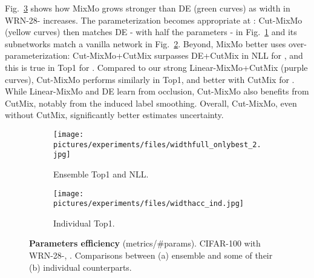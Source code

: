 \documentclass[10pt,twocolumn,letterpaper]{article}
\begin{document}
Fig.~\ref{fig:paramefficient} shows how MixMo grows stronger than DE (green curves) as width  in WRN-28- increases. The parameterization becomes
appropriate at :
Cut-MixMo (yellow curves) then matches DE - with half the parameters - in
Fig.~\ref{fig:widthcx} and its subnetworks match a vanilla
network in Fig.~\ref{fig:indacc}. Beyond, MixMo better uses over-parameterization:
Cut-MixMo+CutMix surpasses DE+CutMix in NLL for , and this is true in Top1 for .
Compared to our strong Linear-MixMo+CutMix (purple curves), Cut-MixMo performs similarly in Top1, and better with CutMix for .
While Linear-MixMo and DE learn from occlusion, Cut-MixMo also benefits from CutMix, notably from the induced label smoothing.
Overall, Cut-MixMo, even without CutMix, significantly better estimates uncertainty.\begin{figure}\centering \begin{subfigure}{.65\linewidth}\centering \texttt{[image: pictures/experiments/files/widthfull\_onlybest\_2.jpg]}\caption{Ensemble Top1 and NLL.}\label{fig:widthcx}\end{subfigure}\begin{subfigure}{.35\linewidth}\centering \texttt{[image: pictures/experiments/files/widthacc\_ind.jpg]}\caption{Individual Top1.}\label{fig:indacc}\end{subfigure}\caption{\textbf{Parameters efficiency} (metrics/\#params). CIFAR-100 with WRN-28-, . Comparisons between (a) ensemble and some of their (b) individual counterparts.}\label{fig:paramefficient}\end{figure}%
\end{document}
